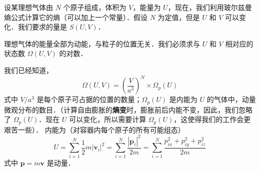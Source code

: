 

设某理想气体由 $N $ 个原子组成，体积为 $V$，能量为 $U$，现在，我们利用玻尔兹曼熵公式计算它的熵（可以加上一个常量）．假设 $N $ 为定值，但是 $U $ 和 $V $ 可以变化．我们要求的量是 $S(U,V)$．

理想气体的能量全部为动能，与粒子的位置无关．我们必须求与 $U$ 和 $V$ 相对应的状态数 $\Omega(U,V)$ 的对数．

我们已经知道，
\begin{equation}
\Omega \left( U,V \right) =\left( \frac{V}{a^3} \right) ^N\times \Omega _p\left( U \right) 
\end{equation}
式中 $V/a^3$ 是每个原子可占据的位置的数量；$\Omega_p(U)$ 是内能为 $U$ 的气体中，动量微观分布的数目．（计算自由膨胀的\textbf{熵变}时，膨胀前后内能不变，因此，我们忽略了 $\Omega_p(U)$．现在 $U$ 可以变化，所以需要计算 $\Omega_p(U)$，这使得我们的工作会更艰苦一些）．
内能为（对容器内每个原子的所有可能组态）
\begin{equation}
U=\sum_{i=1}^N{\frac{1}{2}m\left| \boldsymbol{v}_i \right|^2}=\sum_{i=1}^N{\frac{\left| \boldsymbol{p}_i \right|^2}{2m}}=\sum_{i=1}^N{\frac{p_{ix}^{2}+p_{iy}^{2}+p_{iz}^{2}}{2m}}
\end{equation}
式中 $\boldsymbol p = m\boldsymbol v$ 是动量．

